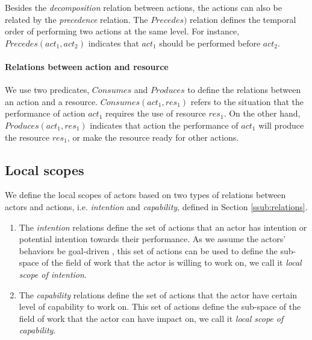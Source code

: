 Besides the \emph{decomposition} relation between actions, the actions can also be related by the \emph{precedence} relation. The $Precedes)$ relation defines the temporal order of performing two actions at the same level. For instance, $Precedes(act_1, act_2)$ indicates that $act_1$ should be performed before $act_2$. 

\paragraph*{Relations between action and resource} %
\label{par:relations_between_action_and_resource}
We use two predicates, $Consumes$ and $Produces$ to define the relations between an action and a resource. $Consumes(act_1, res_1)$ refers to the situation that the performance of action $act_1$ requires the use of resource $res_1$. On the other hand, $Produces(act_1, res_1)$ indicates that action the performance of $act_1$ will produce the resource $res_1$, or make the resource ready for other actions.


\subsection{Local scopes} %
\label{sub:local_scopes}
We define the local scopes of actors based on two types of relations between actors and actions, i.e. \emph{intention} and \emph{capability}, defined in Section \ref{ssub:relations}. 

\begin{enumerate}
	\item The \emph{intention} relations define the set of actions that an actor has intention or potential intention towards their performance. As we assume the actors' behaviors be goal-driven \cite{nardi1996context}, this set of actions can be used to define the sub-space of the field of work that the actor is willing to work on, we call it \emph{local scope of intention}.
	\item The \emph{capability} relations define the set of actions that the actor have certain level of capability to work on. This set of actions define the sub-space of the field of work that the actor can have impact on, we call it \emph{local scope of capability}.
\end{enumerate}

